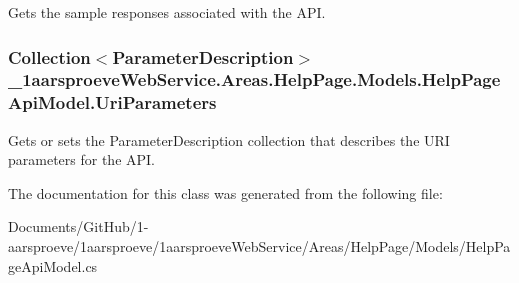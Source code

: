 Gets the sample responses associated with the A\+P\+I. 

\hypertarget{class__1aarsproeve_web_service_1_1_areas_1_1_help_page_1_1_models_1_1_help_page_api_model_a13910e263edc19222bbb60615d1f80be}{}
\subsubsection[{Uri\+Parameters}]{\setlength{\rightskip}{0pt plus 5cm}Collection$<${\bf Parameter\+Description}$>$ \+\_\+1aarsproeve\+Web\+Service.\+Areas.\+Help\+Page.\+Models.\+Help\+Page\+Api\+Model.\+Uri\+Parameters\hspace{0.3cm}{\ttfamily [get]}}\label{class__1aarsproeve_web_service_1_1_areas_1_1_help_page_1_1_models_1_1_help_page_api_model_a13910e263edc19222bbb60615d1f80be}


Gets or sets the Parameter\+Description collection that describes the U\+R\+I parameters for the A\+P\+I. 



The documentation for this class was generated from the following file\+:\begin{DoxyCompactItemize}
\item 
Documents/\+Git\+Hub/1-\/aarsproeve/1aarsproeve/1aarsproeve\+Web\+Service/\+Areas/\+Help\+Page/\+Models/Help\+Page\+Api\+Model.\+cs\end{DoxyCompactItemize}
